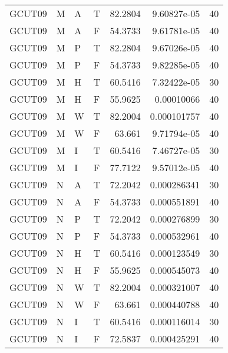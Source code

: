 \begin{tabular}{llllrrr}
    GCUT09   & M     & A     & T          & 82.2804    & 9.60827e-05 & 40       \\
    GCUT09   & M     & A     & F          & 54.3733    & 9.61781e-05 & 40       \\
    GCUT09   & M     & P     & T          & 82.2804    & 9.67026e-05 & 40       \\
    GCUT09   & M     & P     & F          & 54.3733    & 9.82285e-05 & 40       \\
    GCUT09   & M     & H     & T          & 60.5416    & 7.32422e-05 & 30       \\
    GCUT09   & M     & H     & F          & 55.9625    & 0.00010066  & 40       \\
    GCUT09   & M     & W     & T          & 82.2004    & 0.000101757 & 40       \\
    GCUT09   & M     & W     & F          & 63.661     & 9.71794e-05 & 40       \\
    GCUT09   & M     & I     & T          & 60.5416    & 7.46727e-05 & 30       \\
    GCUT09   & M     & I     & F          & 77.7122    & 9.57012e-05 & 40       \\
    GCUT09   & N     & A     & T          & 72.2042    & 0.000286341 & 30       \\
    GCUT09   & N     & A     & F          & 54.3733    & 0.000551891 & 40       \\
    GCUT09   & N     & P     & T          & 72.2042    & 0.000276899 & 30       \\
    GCUT09   & N     & P     & F          & 54.3733    & 0.000532961 & 40       \\
    GCUT09   & N     & H     & T          & 60.5416    & 0.000123549 & 30       \\
    GCUT09   & N     & H     & F          & 55.9625    & 0.000545073 & 40       \\
    GCUT09   & N     & W     & T          & 82.2004    & 0.000321007 & 40       \\
    GCUT09   & N     & W     & F          & 63.661     & 0.000440788 & 40       \\
    GCUT09   & N     & I     & T          & 60.5416    & 0.000116014 & 30       \\
    GCUT09   & N     & I     & F          & 72.5837    & 0.000425291 & 40       \\
    \hline
\end{tabular}